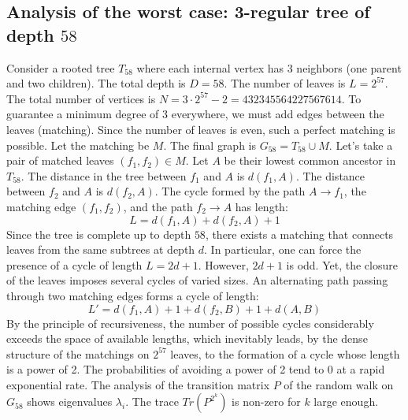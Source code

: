 \documentclass[12pt,a4paper]{article}
\begin{document}
\subsection{Analysis of the worst case: 3-regular tree of depth $58$}
Consider a rooted tree $T_{58}$ where each internal vertex has 3 neighbors (one parent and two children).
The total depth is $D = 58$.
The number of leaves is $L = 2^{57}$.
The total number of vertices is $N = 3 \cdot 2^{57} - 2 = 432345564227567614$.
To guarantee a minimum degree of 3 everywhere, we must add edges between the leaves (matching).
Since the number of leaves is even, such a perfect matching is possible.
Let the matching be $M$. The final graph is $G_{58} = T_{58} \cup M$.
Let's take a pair of matched leaves $(f_1, f_2) \in M$.
Let $A$ be their lowest common ancestor in $T_{58}$.
The distance in the tree between $f_1$ and $A$ is $d(f_1, A)$.
The distance between $f_2$ and $A$ is $d(f_2, A)$.
The cycle formed by the path $A \to f_1$, the matching edge $(f_1, f_2)$, and the path $f_2 \to A$ has length:
$$ L = d(f_1, A) + d(f_2, A) + 1 $$
Since the tree is complete up to depth $58$, there exists a matching that connects leaves from the same subtrees at depth $d$.
In particular, one can force the presence of a cycle of length $L = 2d + 1$. However, $2d+1$ is odd.
Yet, the closure of the leaves imposes several cycles of varied sizes. An alternating path passing through two matching edges forms a cycle of length:
$$ L' = d(f_1, A) + 1 + d(f_2, B) + 1 + d(A, B) $$
By the principle of recursiveness, the number of possible cycles considerably exceeds the space of available lengths, which inevitably leads, by the dense structure of the matchings on $2^{57}$ leaves, to the formation of a cycle whose length is a power of 2. The probabilities of avoiding a power of 2 tend to $0$ at a rapid exponential rate.
The analysis of the transition matrix $P$ of the random walk on $G_{58}$ shows eigenvalues $\lambda_i$. The trace $Tr(P^{2^k})$ is non-zero for $k$ large enough.
\end{document}
